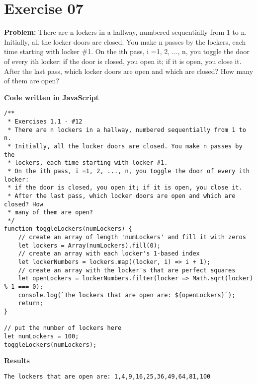 \documentclass[paper=a4, fontsize=11pt]{scrartcl} %
\numberwithin{equation}{section} %
\numberwithin{figure}{section} %
\numberwithin{table}{section} %
\begin{document}

\section{Exercise 07}

\textbf{Problem:} There are n lockers in a hallway, numbered sequentially from 1 to n. Initially, all the locker doors are closed. You make n passes by the lockers, each time starting with locker \#1. On the ith pass, i =1, 2, ..., n, you toggle the door of every ith locker: if the door is closed, you open it; if it is open, you close it. After the last pass, which locker doors are open and which are closed? How many of them are open?

\bigskip
\textbf{Code written in JavaScript}
\begin{lstlisting}
/**
 * Exercises 1.1 - #12
 * There are n lockers in a hallway, numbered sequentially from 1 to n. 
 * Initially, all the locker doors are closed. You make n passes by the 
 * lockers, each time starting with locker #1. 
 * On the ith pass, i =1, 2, ..., n, you toggle the door of every ith locker:
 * if the door is closed, you open it; if it is open, you close it.
 * After the last pass, which locker doors are open and which are closed? How 
 * many of them are open?
 */
function toggleLockers(numLockers) {
    // create an array of length 'numLockers' and fill it with zeros
    let lockers = Array(numLockers).fill(0);
    // create an array with each locker's 1-based index
    let lockerNumbers = lockers.map((locker, i) => i + 1);
    // create an array with the locker's that are perfect squares
    let openLockers = lockerNumbers.filter(locker => Math.sqrt(locker) % 1 === 0);
    console.log(`The lockers that are open are: ${openLockers}`);
    return;
}

// put the number of lockers here
let numLockers = 100;
toggleLockers(numLockers);
\end{lstlisting}

\bigskip
\textbf{Results}
\begin{lstlisting}
The lockers that are open are: 1,4,9,16,25,36,49,64,81,100
\end{lstlisting}

\end{document}
